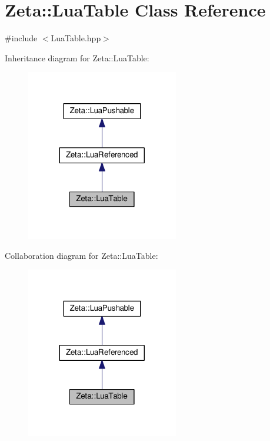 \hypertarget{classZeta_1_1LuaTable}{\section{Zeta\+:\+:Lua\+Table Class Reference}
\label{classZeta_1_1LuaTable}
}


{\ttfamily \#include $<$Lua\+Table.\+hpp$>$}



Inheritance diagram for Zeta\+:\+:Lua\+Table\+:\nopagebreak
\begin{figure}[H]
\begin{center}
\leavevmode
\includegraphics[width=188pt]{classZeta_1_1LuaTable__inherit__graph}
\end{center}
\end{figure}


Collaboration diagram for Zeta\+:\+:Lua\+Table\+:\nopagebreak
\begin{figure}[H]
\begin{center}
\leavevmode
\includegraphics[width=188pt]{classZeta_1_1LuaTable__coll__graph}
\end{center}
\end{figure}
